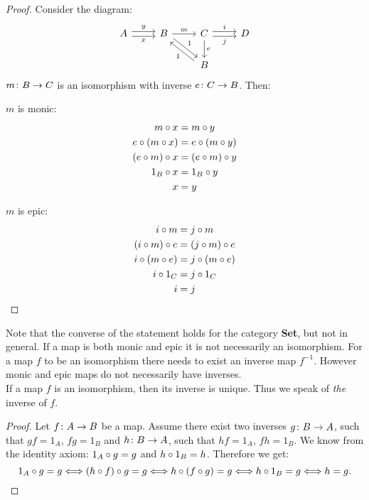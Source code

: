 \begin{proof}
  Consider the diagram:
  \[
    \begin{tikzcd}
      A \arrow[r,shift left, "y"] \arrow[r,shift right,swap,"x"] &
      B \arrow[dr, shift left, "1"]  \arrow{r}{m}  &
      C \arrow{d}{e} \arrow[r,shift left, "i"] \arrow[r,shift right,swap,"j"] & D\\
      &  & B \arrow[ul, shift left, "1"]&
    \end{tikzcd}
  \]
  $m \from B \to C$ is an isomorphism with inverse $e \from C \to B$.
  Then:\\
  \begin{minipage}{.5\linewidth}
    \vspace{4mm}
    \centering $m$ is monic:
    \[
      \begin{aligned}
        m \mathbin{\circ} x &= m \mathbin{\circ} y\\
        e \mathbin{\circ} (m \mathbin{\circ} x) &= e \mathbin{\circ} (m \mathbin{\circ} y)\\
        (e \mathbin{\circ} m) \mathbin{\circ} x &= (e \mathbin{\circ} m) \mathbin{\circ} y\\
        1_B \mathbin{\circ} x &= 1_B \mathbin{\circ} y\\
        x &= y
      \end{aligned}
    \]
  \end{minipage}%
  \begin{minipage}{.5\linewidth}
    \vspace{4mm}
    \centering $m$ is epic:
    \[
      \begin{aligned}
        i \mathbin{\circ} m &= j \mathbin{\circ} m \\
        (i \mathbin{\circ} m) \mathbin{\circ} e &= (j \mathbin{\circ} m) \mathbin{\circ} e\\
        i \mathbin{\circ} (m \mathbin{\circ} e) &= j \mathbin{\circ} (m \mathbin{\circ} e)\\
        i \mathbin{\circ} 1_C &= j \mathbin{\circ} 1_C\\
        i &= j
      \end{aligned}
    \]
  \end{minipage}%
\end{proof}
Note that the converse of the statement holds for the category \textbf{Set}, but not in general.
If a map is both monic and epic it is not necessarily an isomorphism.
For a map $f$ to be an isomorphism there needs to exist an inverse map $f^{-1}$.
However monic and epic maps do not necessarily have inverses.\\[1mm]
If a map $f$ is an isomorphism, then its inverse is unique. Thus we speak of
\emph{the} inverse of $f$.

\begin{proof}
  Let $f \from A \to B$ be a map.
  Assume there exist two inverses $g \from B \to A$, such that $gf = 1_A$, $fg = 1_B$ and \mbox{$h \from B \to A$}, such that $hf = 1_A$, $fh = 1_B$.
  We know from the identity axiom: $1_A \mathbin{\circ} g = g$ and $h \mathbin{\circ} 1_B = h$. Therefore we get:
 \[  1_A \mathbin{\circ} g = g \Longleftrightarrow (h \mathbin{\circ} f) \mathbin{\circ} g = g \Longleftrightarrow h \mathbin{\circ} (f \mathbin{\circ} g) = g \Longleftrightarrow h \mathbin{\circ} 1_B = g \Longleftrightarrow h=g. \]
\end{proof}

